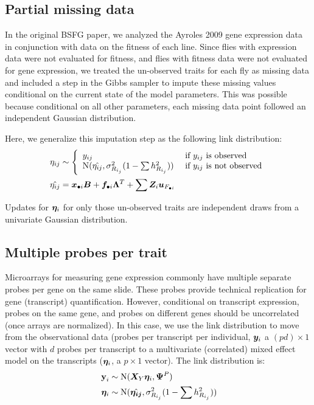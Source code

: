 \documentclass[11pt]{amsart}
\newcommand*{\B}[1]{\ifmmode\bm{#1}\else\textbf{#1}\fi}
\begin{document}
\subsection{Partial missing data}
In the original BSFG paper, we analyzed the Ayroles 2009 gene expression data in conjunction with data on the fitness of each line. Since flies with expression data were not evaluated for fitness, and flies with fitness data were not evaluated for gene expression, we treated the un-observed traits for each fly as missing data and included a step in the Gibbs sampler to impute these missing values conditional on the current state of the model parameters. This was possible because conditional on all other parameters, each missing data point followed an independent Gaussian distribution.

Here, we generalize this imputation step as the following link distribution:
\begin{align} \begin{split}
\eta_{ij} &\sim \Bigg\{\begin{array}{l l}
y_{ij} & \mbox{ if } y_{ij} \mbox{ is observed} \\
\mbox{N}(\hat{\eta_{ij}},\sigma^2_{R_{i_j}}(1-\sum h^2_{R_{i_j}})) & \mbox{ if } y_{ij} \mbox{ is not observed}
\end{array} \\
\hat{\eta_{ij}} &= \B{x}_{\bullet i} \B{B} + \B{f}_{\bullet i} \B{\Lambda}^T + \sum \B{Z}_i \B{u}_{F_{\bullet i}}
\end{split}\end{align}

\noindent Updates for $\B{\eta}_i$ for only those un-observed traits are independent draws from a univariate Gaussian distribution. 

\subsection{Multiple probes per trait}
Microarrays for measuring gene expression commonly have multiple separate probes per gene on the same slide. These probes provide technical replication for gene (transcript) quantification. However, conditional on transcript expression, probes on the same gene, and probes on different genes should be uncorrelated (once arrays are normalized). In this case, we use the link distribution to move from the observational data (probes per transcript per individual, $\B{y}_i$ a $(p d) \times 1$ vector with $d$ probes per transcript to a multivariate (correlated) mixed effect model on the transcripts ($\B{\eta}_i$, a $p \times 1$ vector). The link distribution is:
\begin{align} \begin{split}
\B{y}_i &\sim \mbox{N}(\B{X}_Y \B{\eta}_i, \B{\Psi}^P) \\
\;\B{\eta}_i &\sim \mbox{N}(\hat{\B{\eta_{ij}}},\sigma^2_{R_{i_j}}(1-\sum h^2_{R_{i_j}}))
\end{split}\end{align}
\end{document}
